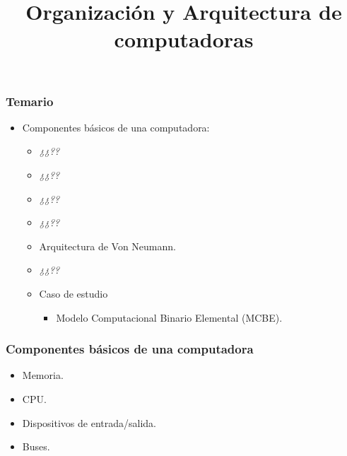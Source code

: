 \documentclass[11pt,a4paper,spanish]{beamer}
\title{Organización y Arquitectura de computadoras}
\author{}
\date{}
\begin{document}
\begin{frame}[noframenumbering]


    \maketitle
    \centering

\end{frame}

\begin{frame}

    \frametitle{Temario}

\begin{itemize}

    \item Componentes básicos de una computadora:
    \begin{itemize}
        \item \emph{¿¿??}
        \item \emph{¿¿??}
        \item \emph{¿¿??}
        \item \emph{¿¿??}
        \item Arquitectura de Von Neumann.
        \item \emph{¿¿??}
        \item Caso de estudio
            \begin{itemize}
                \item Modelo Computacional Binario Elemental (MCBE).
            \end{itemize}
    \end{itemize}

\end{itemize}
\end{frame}

\begin{frame}
    \frametitle{Componentes básicos de una computadora}
    \begin{itemize}
        \pause
        \item Memoria.
        \pause
        \item CPU.
        \pause
        \item Dispositivos de entrada/salida.
        \pause
        \item Buses.
    \end{itemize}
\end{frame}
\end{document}
